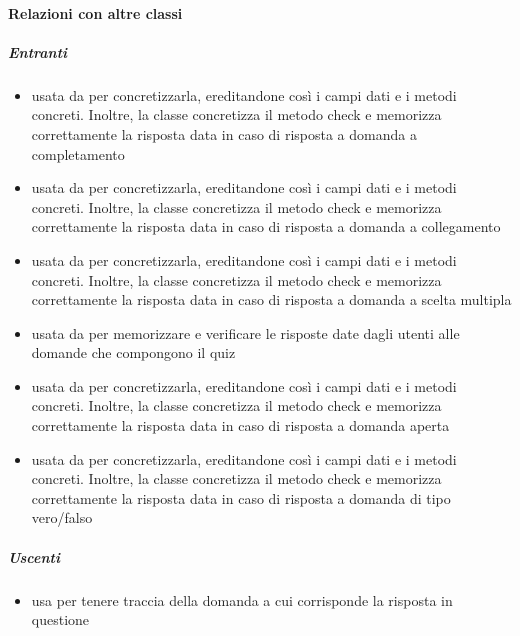 \paragraph{Relazioni con altre classi}
\subparagraph{Entranti}
\begin{itemize}
\item usata da  per concretizzarla, ereditandone così i campi dati e i metodi concreti. Inoltre, la classe concretizza il metodo check e memorizza correttamente la risposta data in caso di risposta a domanda a completamento
\item usata da  per concretizzarla, ereditandone così i campi dati e i metodi concreti. Inoltre, la classe concretizza il metodo check e memorizza correttamente la risposta data in caso di risposta a domanda a collegamento
\item usata da  per concretizzarla, ereditandone così i campi dati e i metodi concreti. Inoltre, la classe concretizza il metodo check e memorizza correttamente la risposta data in caso di risposta a domanda a scelta multipla
\item usata da  per memorizzare e verificare le risposte date dagli utenti alle domande che compongono il quiz
\item usata da  per concretizzarla, ereditandone così i campi dati e i metodi concreti. Inoltre, la classe concretizza il metodo check e memorizza correttamente la risposta data in caso di risposta a domanda aperta
\item usata da  per concretizzarla, ereditandone così i campi dati e i metodi concreti. Inoltre, la classe concretizza il metodo check e memorizza correttamente la risposta data in caso di risposta a domanda di tipo vero/falso
\end{itemize}
\subparagraph{Uscenti}
\begin{itemize}
\item usa  per tenere traccia della domanda a cui corrisponde la risposta in questione
\end{itemize}
